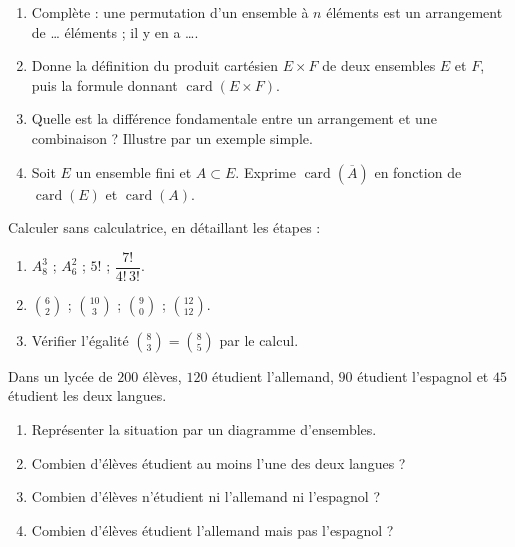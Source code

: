 \documentclass[11pt]{article}
\newcommand{\cle}[1]{{\popxbold\color{popdark}#1}}
\newcounter{popsec}
\newcounter{popsub}
\newcommand{\courssub}[1]{%
  \stepcounter{popsub}%
  \par\vspace{9pt}\noindent{\popxbold\fontsize{11.5}{13}\selectfont\color{popink}{\color{poporange}\thepopsec.\thepopsub}\hspace{6pt}#1}\par\nopagebreak\vspace{4pt}
}
\begin{document}
\begin{exercice}
\begin{enumerate}
\item Complète : une \cle{permutation} d'un ensemble à $n$ éléments est un arrangement de \ldots{} éléments ; il y en a \ldots{}.
\item Donne la définition du \cle{produit cartésien} $E\times F$ de deux ensembles $E$ et $F$, puis la formule donnant $\operatorname{card}(E\times F)$.
\item Quelle est la différence fondamentale entre un \cle{arrangement} et une \cle{combinaison} ? Illustre par un exemple simple.
\item Soit $E$ un ensemble fini et $A\subset E$. Exprime $\operatorname{card}(\overline{A})$ en fonction de $\operatorname{card}(E)$ et $\operatorname{card}(A)$.
\end{enumerate}
\end{exercice}

\begin{exercice}
Calculer sans calculatrice, en détaillant les étapes :
\begin{enumerate}
\item $A_8^3$ ; \quad $A_6^2$ ; \quad $5!$ ; \quad $\dfrac{7!}{4!\,3!}$.
\item $\binom{6}{2}$ ; \quad $\binom{10}{3}$ ; \quad $\binom{9}{0}$ ; \quad $\binom{12}{12}$.
\item Vérifier l'égalité $\binom{8}{3}=\binom{8}{5}$ par le calcul.
\end{enumerate}
\end{exercice}

\courssub{Je m'entraîne}

\begin{exercice}
Dans un lycée de $200$ élèves, $120$ étudient l'allemand, $90$ étudient l'espagnol et $45$ étudient les deux langues.
\begin{enumerate}
\item Représenter la situation par un diagramme d'ensembles.
\item Combien d'élèves étudient au moins l'une des deux langues ?
\item Combien d'élèves n'étudient ni l'allemand ni l'espagnol ?
\item Combien d'élèves étudient l'allemand mais pas l'espagnol ?
\end{enumerate}
\end{exercice}
\end{document}
